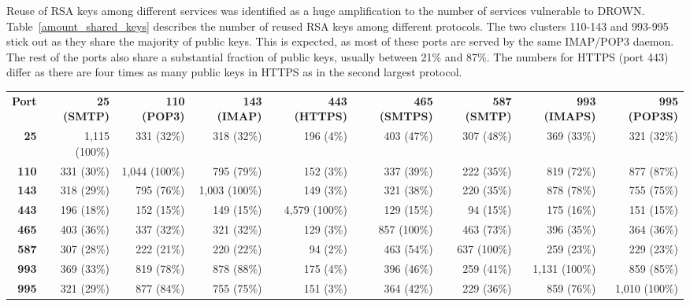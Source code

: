 Reuse of RSA keys among different services was identified as a huge amplification to the number of services vulnerable to DROWN\@. Table~\ref{amount_shared_keys} describes the number of reused RSA keys among different protocols. The two clusters 110-143 and 993-995 stick out as they share the majority of public keys. This is expected, as most of these ports are served by the same IMAP/POP3 daemon. 
The rest of the ports also share a substantial fraction of public keys, usually between 21\% and 87\%. The numbers for HTTPS (port 443) differ as there are four times as many public keys in HTTPS as in the second largest protocol.
\begin{table*}[th]
\centering\footnotesize
 \begin{tabular}{rrrrrrrrr} 
\toprule

\textbf{Port} & \textbf{25 (SMTP)} & \textbf{110 (POP3)} & \textbf{143 (IMAP)} & \textbf{443 (HTTPS)} & \textbf{465 (SMTPS)} & \textbf{587 (SMTP)} & \textbf{993 (IMAPS)} & \textbf{995 (POP3S)}\smallskip\\
\textbf{ 25} &  1,115 (100\%) &           331 (32\%) &       318 (32\%) &       196 (4\%) &        403 (47\%) &       307 (48\%) &       369 (33\%) &       321 (32\%) \\
\textbf{110} &    331 (30\%) &         1,044 (100\%) &      795 (79\%) &       152 (3\%) &        337 (39\%) &       222 (35\%) &       819 (72\%) &       877 (87\%) \\
\textbf{143} &    318 (29\%) &           795 (76\%) &     1,003 (100\%) &      149 (3\%) &        321 (38\%) &       220 (35\%) &       878 (78\%) &       755 (75\%) \\
\textbf{443} &    196 (18\%) &           152 (15\%) &       149 (15\%) &     4,579 (100\%) &      129 (15\%) &        94 (15\%) &       175 (16\%) &       151 (15\%) \\
\textbf{465} &    403 (36\%) &           337 (32\%) &       321 (32\%) &       129 (3\%) &        857 (100\%) &      463 (73\%) &       396 (35\%) &       364 (36\%) \\
\textbf{587} &    307 (28\%) &           222 (21\%) &       220 (22\%) &        94 (2\%) &        463 (54\%) &       637 (100\%) &      259 (23\%) &       229 (23\%) \\
\textbf{993} &    369 (33\%) &           819 (78\%) &       878 (88\%) &       175 (4\%) &        396 (46\%) &       259 (41\%) &     1,131 (100\%) &      859 (85\%) \\
\textbf{995} &    321 (29\%) &           877 (84\%) &       755 (75\%) &       151 (3\%) &        364 (42\%) &       229 (36\%) &       859 (76\%) &     1,010 (100\%) \\

\bottomrule
 \end{tabular}
 \caption{\textbf{Impact of key reuse across ports.} Number of shared public keys among two ports, in thousands.
          Each column states what number and percentage of keys from the port in the header row are used on other ports.
          For example, 18\% of keys used on port 25 are also used on port 443, but only 4\% of keys used on port 443 are also used on port 25. }
 \label{amount_shared_keys}
\end{table*}

